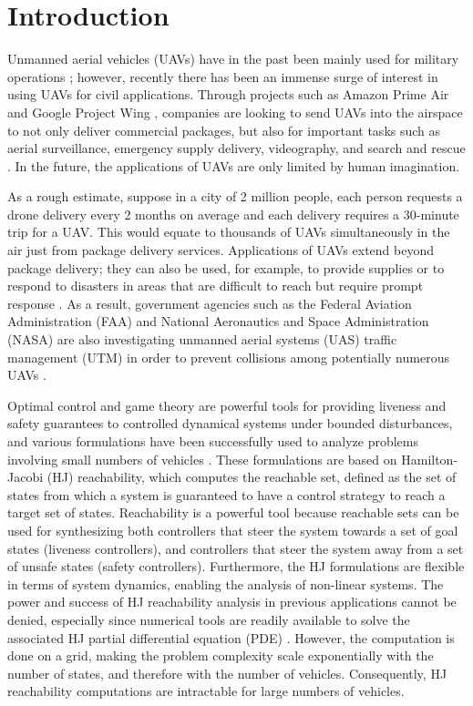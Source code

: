 \section{Introduction}
Unmanned aerial vehicles (UAVs) have in the past been mainly used for military operations \cite{Tice91}; however, recently there has been an immense surge of interest in using UAVs for civil applications. Through projects such as Amazon Prime Air \cite{PrimeAir} and Google Project Wing \cite{ProjectWing}, companies are looking to send UAVs into the airspace to not only deliver commercial packages, but also for important tasks such as aerial surveillance, emergency supply delivery, videography, and search and rescue \cite{Kopardekar16}. In the future, the applications of UAVs are only limited by human imagination. 

As a rough estimate, suppose in a city of 2 million people, each person requests a drone delivery every 2 months on average and each delivery requires a 30-minute trip for a UAV. This would equate to thousands of UAVs simultaneously in the air just from package delivery services. Applications of UAVs extend beyond package delivery; they can also be used, for example, to provide supplies or to respond to disasters in areas that are difficult to reach but require prompt response \cite{Debusk10,Tornado16}. As a result, government agencies such as the Federal Aviation Administration (FAA) and National Aeronautics and Space Administration (NASA) are also investigating unmanned aerial systems (UAS) traffic management (UTM) in order to prevent collisions among potentially numerous UAVs \cite{Kopardekar16, FAA13, NASA16}. 

Optimal control and game theory are powerful tools for providing liveness and safety guarantees to controlled dynamical systems under bounded disturbances, and various formulations \cite{Bokanowski10,Mitchell05,Barron89} have been successfully used to analyze problems involving small numbers of vehicles \cite{Fisac15,Chen14,Chen17,Ding08}. These formulations are based on Hamilton-Jacobi (HJ) reachability, which computes the reachable set, defined as the set of states from which a system is guaranteed to have a control strategy to reach a target set of states. Reachability is a powerful tool because reachable sets can be used for synthesizing both controllers that steer the system towards a set of goal states (liveness controllers), and controllers that steer the system away from a set of unsafe states (safety controllers). Furthermore, the HJ formulations are flexible in terms of system dynamics, enabling the analysis of non-linear systems. The power and success of HJ reachability analysis in previous applications cannot be denied, especially since numerical tools are readily available to solve the associated HJ partial differential equation (PDE) \cite{LSToolbox,Osher02,Sethian96}. However, the computation is done on a grid, making the problem complexity scale exponentially with the number of states, and therefore with the number of vehicles. Consequently, HJ reachability computations are intractable for large numbers of vehicles. 


